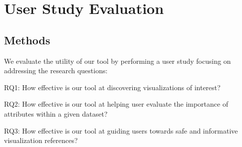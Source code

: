 \section{User Study Evaluation\label{sec:userstudy}}
\subsection{Methods}
We evaluate the utility of our tool by performing a user study focusing on addressing the research questions:
\begin{denselist}
	\item RQ1: How effective is our tool at discovering visualizations of interest?
	\item RQ2: How effective is our tool at helping user evaluate the importance of attributes within a given dataset?
	\item RQ3: How effective is our tool at guiding users towards safe and informative visualization references? 
\end{denselist}

